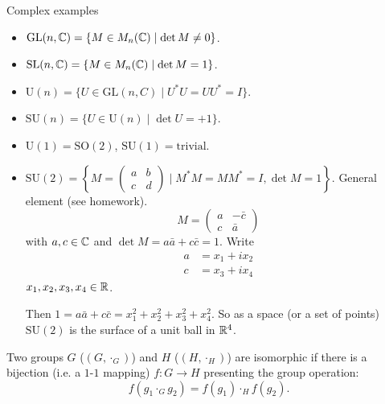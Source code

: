 \documentclass[10pt, a4paper]{article}
\begin{document}
Complex examples
\begin{example}
    \begin{itemize}
        \item $\mathrm{GL}(n, \mathbb{C}) = \{M \in M_n(\mathbb{C})\mid\det{M} \neq 0\}$.
        
        \item $\mathrm{SL}(n, \mathbb{C}) = \{M \in M_n(\mathbb{C})\mid\det{M} = 1\}$.
        
        \item $\mathrm{U}(n) = \{U \in \mathrm{GL}(n, C)\mid U ^ {*}U = UU ^ {*} = I\}$.
        
        \item $\mathrm{SU}(n) = \{U \in \mathrm{U}(n)\mid \det{U} = +1\}$.

        \item $\mathrm{U}(1) = \mathrm{SO}(2)$,
        $\mathrm{SU}(1) = \text{trivial}$.

        \item $\mathrm{SU}(2) = \left\{M = \begin{pmatrix}
            a & b \\ c & d
        \end{pmatrix}\mid M ^ {*}M = MM ^ {*} = I, \det{M} = 1\right\}$.
        General element
        (see homework).
        \[
        M = \begin{pmatrix}
            a & -\bar{c} \\ c & \bar{a}
        \end{pmatrix}
        \]
        with $a, c \in \mathbb{C}$ and $\det{M} = a\bar{a} + c\bar{c} = 1$.
        Write
        \begin{align*}
            a &= x_1 + ix_2 \\
            c &= x_3 + ix_4
        \end{align*}
        $x_1, x_2, x_3, x_4 \in \mathbb{R}$.

        Then $1 = a\bar{a} + c\bar{c} = x_1 ^ 2 + x_2 ^ 2 + x_3 ^ 2 + x_4 ^ 2$.
        So as a space
        (or a set of points)
        $\mathrm{SU}(2)$ is the surface of a unit ball in $\mathbb{R} ^ 4$.
    \end{itemize}
\end{example}

\begin{definition}
    Two groups $G$
    ($(G, \cdot_G)$)
    and $H$
    ($(H, \cdot_H)$)
    are isomorphic if there is a bijection 
    (i.e. a $1$-$1$ mapping)
    $f : G \to H$ presenting the group operation:
    \begin{equation}\label{linalg:eq:1}\tag{$\dagger$}
        f(g_1 \cdot_G g_2) = f(g_1) \cdot_H f(g_2).
    \end{equation}
\end{definition}
\end{document}
